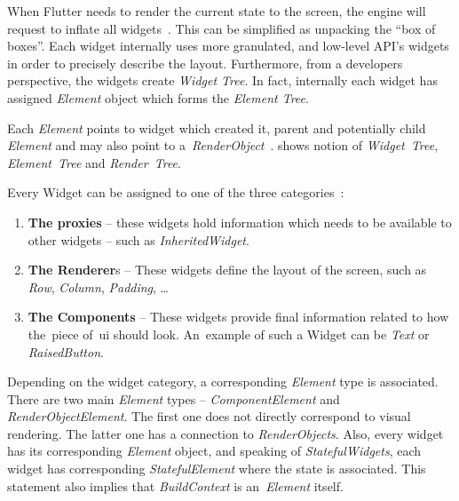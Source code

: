 When Flutter needs to render the current state to the screen, the engine will request to inflate all widgets~\cite{didier-internals}. This can be simplified as unpacking the ``box of boxes''. Each widget internally uses more granulated, and low-level API's widgets in order to precisely describe the layout. Furthermore, from a developers perspective, the widgets create \textit{Widget Tree}. In fact, internally each widget has assigned \textit{Element} object which forms the \textit{Element Tree}.

Each \textit{Element} points to widget which created it, parent and potentially child \textit{Element} and may also point to a~\textit{RenderObject}~\cite{didier-internals}.   shows notion of \textit{Widget~Tree}, \textit{Element~Tree} and \textit{Render~Tree}.

Every Widget can be assigned to one of the three categories~\cite{didier-internals}:
\begin{enumerate}
\item \textbf{The proxies}  -- these widgets hold information which needs to be available to other widgets -- such as \textit{InheritedWidget}.
\item \textbf{The Renderer}s -- These widgets define the layout of the screen, such as \textit{Row}, \textit{Column}, \textit{Padding}, \ldots
\item \textbf{The Components} -- These widgets provide final information related to how the~piece of~\gls{ui} should look. An~example of such a Widget can be \textit{Text} or \textit{RaisedButton}. 
\end{enumerate}
Depending on the widget category, a corresponding \textit{Element} type is associated. There are two main \textit{Element} types -- \textit{ComponentElement} and \textit{RenderObjectElement}. The first one does not directly correspond to visual rendering. The latter one has a connection to \textit{RenderObjects}. Also, every widget has its corresponding \textit{Element} object, and speaking of \textit{StatefulWidgets}, each widget has corresponding \textit{StatefulElement} where the state is associated. This statement also implies that \textit{BuildContext} is an~\textit{Element} itself. 
